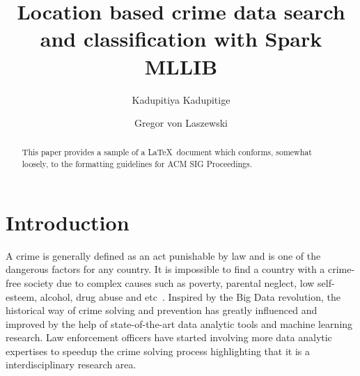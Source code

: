 
\title{Location based crime data search and classification with Spark MLLIB}


\author{Kadupitiya Kadupitige}

\author{Gregor von Laszewski}


\renewcommand{\shortauthors}{G. v. Laszewski}


\begin{abstract}
This paper provides a sample of a \LaTeX\ document which conforms,
somewhat loosely, to the formatting guidelines for
ACM SIG Proceedings.
\end{abstract}



\maketitle


\section{Introduction}

A crime is generally defined as an act punishable by law and is one of the 
dangerous factors for any country\cite{hid-sp18-409-agarwal2013crime}. It is 
impossible to find a country with a 
crime- free society due to complex causes such as poverty, parental neglect, 
low self-esteem, alcohol, drug abuse and 
etc~\cite{hid-sp18-409-bharathi2014survey, hid-sp18-409-kiani2015analysis}. 
Inspired by the Big Data revolution, the historical way of crime solving and 
prevention has greatly influenced and improved by the help of state-of-the-art 
data analytic tools and machine learning research. Law enforcement officers 
have started involving more data analytic expertises to speedup the crime 
solving process highlighting that it is a interdisciplinary research area.


